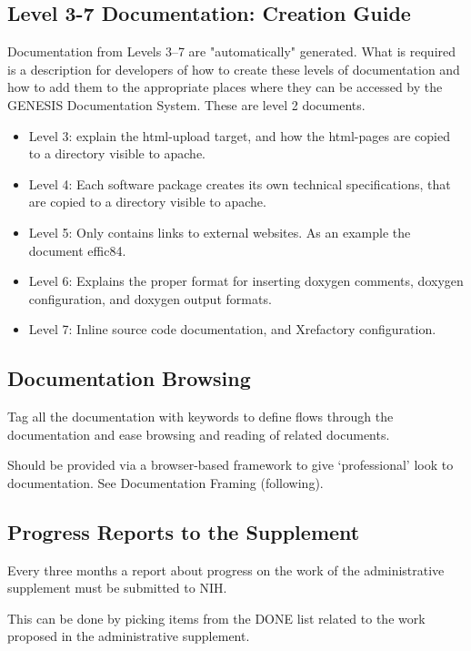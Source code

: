\documentclass[12pt]{article}
\begin{document}
\subsection{Level 3-7 Documentation: Creation Guide}

Documentation from Levels 3--7 are "automatically" generated. What is
required is a description for developers of how to create these levels
of documentation and how to add them to the appropriate places where
they can be accessed by the GENESIS Documentation System.  These are
level 2 documents.

\begin{itemize}
\item Level 3: explain the html-upload target, and how the html-pages
  are copied to a directory visible to apache.
\item Level 4: Each software package creates its own technical
  specifications, that are copied to a directory visible to apache.
\item Level 5: Only contains links to external websites.  As an
  example the document effic84.
\item Level 6: Explains the proper format for inserting doxygen comments,
 doxygen configuration, and doxygen output formats.
\item Level 7: Inline source code documentation, and Xrefactory configuration. 
\end{itemize}

\subsection{Documentation Browsing}

Tag all the documentation with keywords to define flows through the
documentation and ease browsing and reading of related documents.

Should be provided via a browser-based framework to give
`professional' look to documentation. See Documentation Framing
(following).


\subsection{Progress Reports to the Supplement}

Every three months a report about progress on the work of the
administrative supplement must be submitted to NIH.

This can be done by picking items from the DONE list related to the
work proposed in the administrative supplement.
\end{document}
